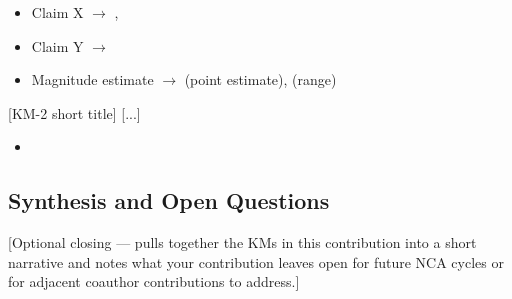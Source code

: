 \begin{itemize}
  \item Claim X $\rightarrow$ \cite{[citekey1]}, \cite{[citekey2]}
  \item Claim Y $\rightarrow$ \cite{[citekey3]}
  \item Magnitude estimate $\rightarrow$ \cite{[citekey4]} (point estimate),
        \cite{[citekey5]} (range)
\end{itemize}


\begin{keymessage}{[KM-2 short title]}
[...] \confidence{[level]}
\end{keymessage}

\evidencebase
[...]

\uncertainties
[...]

\confidencedesc
[...]

\traceableaccount
\begin{itemize}
  \item [...]
\end{itemize}


\subsection*{Synthesis and Open Questions}

[Optional closing — pulls together the KMs in this contribution into a
short narrative and notes what your contribution leaves open for future
NCA cycles or for adjacent coauthor contributions to address.]
